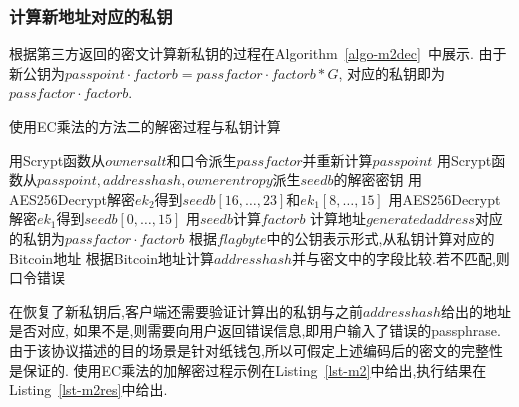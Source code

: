 \subsubsection{计算新地址对应的私钥}
根据第三方返回的密文计算新私钥的过程在Algorithm~\ref{algo-m2dec}~中展示.
由于新公钥为$passpoint\cdot factorb=passfactor\cdot factorb *G$,
对应的私钥即为$passfactor\cdot factorb$.

\begin{algorithm}[h]\footnotesize
\caption{使用EC乘法的方法二的解密过程与私钥计算}\label{algo-m2dec}
  	\begin{algorithmic}[1]
	   \STATE  用Scrypt函数从$ownersalt$和口令派生$passfactor$并重新计算$passpoint$
	   \STATE 用Scrypt函数从$passpoint, addresshash, ownerentropy$派生$seedb$的解密密钥
		\STATE 用\textsf{AES256Decrypt}解密$ek_2$得到$seedb[16,\dots,23]$和$ek_1[8,\dots,15]$
		\STATE 用\textsf{AES256Decrypt}解密$ek_1$得到$seedb[0,\dots,15]$
		\STATE 用$seedb$计算$factorb$
		\STATE 计算地址$generatedaddress$对应的私钥为$passfactor \cdot factorb$
		\STATE 根据$flagbyte$中的公钥表示形式,从私钥计算对应的Bitcoin地址
		\STATE 根据Bitcoin地址计算$addresshash$并与密文中的字段比较.若不匹配,则口令错误
    \end{algorithmic}
\end{algorithm}

在恢复了新私钥后,客户端还需要验证计算出的私钥与之前$addresshash$给出的地址是否对应,
如果不是,则需要向用户返回错误信息,即用户输入了错误的passphrase.
由于该协议描述的目的场景是针对纸钱包,所以可假定上述编码后的密文的完整性是保证的.
使用EC乘法的加解密过程示例在Listing~\ref{lst-m2}中给出,执行结果在Listing~\ref{lst-m2res}中给出.


